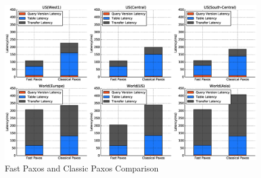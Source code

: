\begin{figure}[t]
      \includegraphics[width=\linewidth]{plots/metadata}
      \caption{Fast Paxos and Classic Paxos Comparison}
      \label{fig:metadata}
\end{figure}
